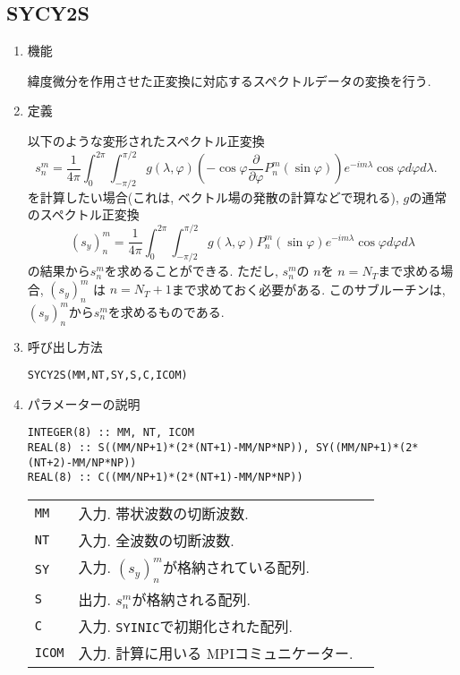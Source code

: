 \documentclass[a4j]{jsarticle}
\begin{document}

\subsection{SYCY2S}

\begin{enumerate}

\item 機能 

緯度微分を作用させた正変換に対応するスペクトルデータの変換を行う.

\item 定義

以下のような変形されたスペクトル正変換
\begin{equation}
s^m_n=\frac1{4\pi}\int^{2\pi}_0\int^{\pi/2}_{-\pi/2}
g(\lambda,\varphi)
\left(-\cos\varphi\frac{\partial}{\partial\varphi}P^m_n(\sin\varphi)\right)
e^{-im\lambda}\cos\varphi d\varphi
d\lambda .
\quad 
\end{equation}
を計算したい場合(これは, ベクトル場の発散の計算などで現れる), 
$g$の通常のスペクトル正変換
\begin{equation}
(s_y)^m_n=\frac1{4\pi}\int^{2\pi}_0\int^{\pi/2}_{-\pi/2}
g(\lambda,\varphi)
P^m_n(\sin\varphi)
e^{-im\lambda}\cos\varphi d\varphi
d\lambda
\end{equation}
の結果から$s^m_n$を求めることができる.
ただし, $s^m_n$の $n$を $n=N_T$まで求める場合, $(s_y)^m_n$
は $n=N_T+1$まで求めておく必要がある.
このサブルーチンは, $(s_y)^m_n$から$s^m_n$を求めるものである.

\item 呼び出し方法 

\texttt{SYCY2S(MM,NT,SY,S,C,ICOM)}
  
\item パラメーターの説明

\begin{verbatim}
INTEGER(8) :: MM, NT, ICOM
REAL(8) :: S((MM/NP+1)*(2*(NT+1)-MM/NP*NP)), SY((MM/NP+1)*(2*(NT+2)-MM/NP*NP))
REAL(8) :: C((MM/NP+1)*(2*(NT+1)-MM/NP*NP))
\end{verbatim}

\begin{tabular}{lll}
\texttt{MM} & 入力. 帯状波数の切断波数.\\  
\texttt{NT} & 入力. 全波数の切断波数.\\
\texttt{SY} & 入力. $(s_y)^m_n$が格納されている配列.\\
\texttt{S} &  出力. $s^m_n$が格納される配列.\\
\texttt{C} & 入力. \texttt{SYINIC}で初期化された配列.\\
\texttt{ICOM} & 入力. 計算に用いる MPIコミュニケーター.
\end{tabular}


\end{enumerate}
\end{document}

